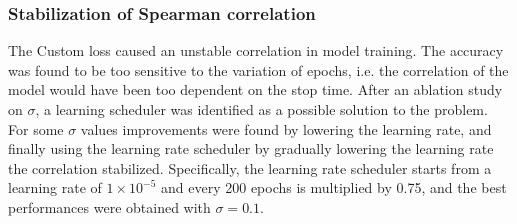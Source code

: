\subsubsection{Stabilization of Spearman correlation}
The Custom loss caused an unstable correlation in model training. The accuracy was found to be too sensitive to the variation of epochs, i.e. the correlation of the model would have been too dependent on the stop time.
After an ablation study on $\sigma$, a learning scheduler \cite{2012practical} was identified as a possible solution to the problem.
For some $\sigma$ values improvements were found by lowering the learning rate, and finally using the learning rate scheduler by gradually lowering the learning rate the correlation stabilized.
Specifically, the learning rate scheduler starts from a learning rate of $1 \times 10^{-5}$ and every 200 epochs is multiplied by 0.75, and the best performances were obtained with $\sigma = 0.1$.













